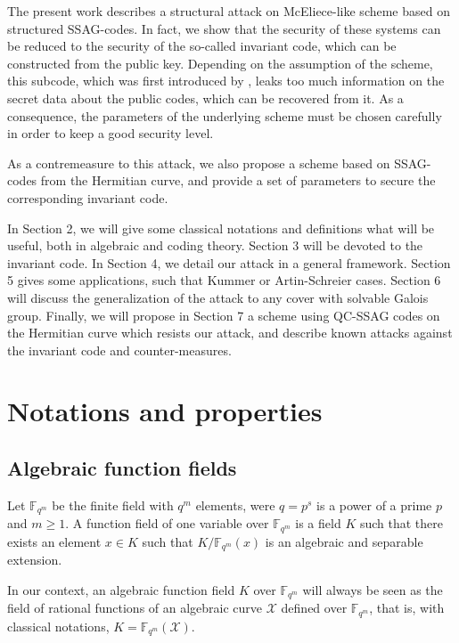 \documentclass[10pt]{article}
\newcommand{\s}{\vspace{0.3cm}}
\newcommand{\fqm}{\mathbb{F}_{q^m}}
\newcommand{\X}{\mathcal{X}}
\begin{document}
\s

The present work describes a structural attack on McEliece-like scheme based on structured SSAG-codes. In fact, we show that the security of these systems can be reduced to the security of the so-called invariant code, which can be constructed from the public key. Depending on the assumption of the scheme, this subcode, which was first introduced by \cite{LOI}, leaks too much information on the secret data about the public codes, which can be recovered from it. As a consequence, the parameters of the underlying scheme must be chosen carefully in order to keep a good security level.

\s

As a contremeasure to this attack, we also propose a scheme based on SSAG-codes from the Hermitian curve, and provide a set of parameters to secure the corresponding invariant code.

\s

In Section 2, we will give some classical notations and definitions what will be useful, both in algebraic and coding theory. Section 3 will be devoted to the invariant code. In Section 4, we detail our attack in a general framework. Section 5 gives some applications, such that Kummer or Artin-Schreier cases. Section 6 will discuss the generalization of the attack to any cover with solvable Galois group. Finally, we will propose in Section 7 a scheme using QC-SSAG codes on the Hermitian curve which resists our attack, and describe known attacks against the invariant code and counter-measures.


\s

\section{Notations and properties}

\s

\subsection{Algebraic function fields}

\s


Let $\fqm$ be the finite field with $q^m$ elements, were $q=p^s$ is a power of a prime $p$ and $m \geq 1$. A function field of one variable over $\fqm$ is a field $K$ such that there exists an element $x\in K$ such that $K/\fqm(x)$ is an algebraic and separable extension. 

In our context, an algebraic function field $K$ over $\fqm$ will always be seen as the field of rational functions of an algebraic curve $\X$ defined over $\fqm$, that is, with classical notations, $K = \fqm(\X)$.
\end{document}
